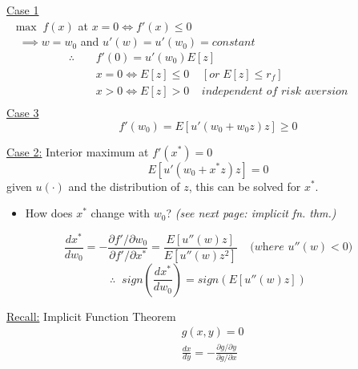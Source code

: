 \documentclass[
14pt,notheorems,hyperref={pdfauthor=whatever}
]{beamer}
\begin{document}
\begin{frame}
\underline{Case 1}\\
\hfill \break
$\;\;\max\;f(x)$ at $x=0 \iff f'(x) \leq 0$\\
$\;\;\;\;\implies w=w_0$ and $u'(w) = u'(w_0) = \textit{constant}$\\
\begin{align*}
    \therefore \;\;\;\;&f'(0) = u'(w_0)E[z]\\
    &x=0 \iff E[z] \leq 0 \;\;\;\; [or\; E[z] \leq r_f]\\
    &x>0 \iff E[z] > 0\;\;\;\; \textit{independent of risk aversion}\\
\end{align*}
\underline{Case 3}\\
\[f'(w_0) = E[u'(w_0+w_0z)z] \geq 0\]
\end{frame}

\begin{frame}
\underline{Case 2:} Interior maximum at $f'(x^*)=0$\\
\[E[u'(w_0+x^*z)z] = 0\]
\hfill \break
given $u(\cdot)$ and the distribution of $z$, this can be solved for $x^*$.\\
\hfill \break
\begin{itemize}
    \item How does $x^*$ change with $w_0$? \textit{(see next page: implicit fn. thm.)}\\
\end{itemize}
\[\frac{dx^*}{dw_0} = -\frac{\partial f'/\partial w_0}{\partial f'/\partial x^*} = \frac{E[u''(w)z]}{E[u''(w)z^2]}\;\;\;\;\textit{(where $u''(w) < 0$)}\]
\[\therefore \;\; sign(\frac{dx^*}{dw_0}) = sign(E[u''(w)z])\]
\end{frame}

\begin{frame}
\underline{Recall:} Implicit Function Theorem\\
\begin{align*}
    &g(x,y) = 0\\
    &\frac{dx}{dy} = -\frac{\partial g / \partial y}{\partial g / \partial x}\\
\end{align*}
\end{frame}
\end{document}
